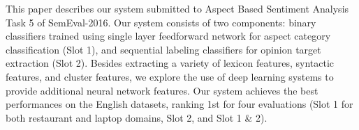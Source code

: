 This paper describes our system submitted to Aspect Based Sentiment Analysis Task 5 of SemEval-2016. Our system consists of two components: binary classifiers trained using single layer feedforward network for aspect category classification (Slot 1), and sequential labeling classifiers for opinion target extraction (Slot 2). Besides extracting a variety of lexicon features, syntactic features, and cluster features, we explore the use of deep learning systems to provide additional neural network features. Our system achieves the best performances on the English datasets, ranking 1st for four evaluations (Slot 1 for both restaurant and laptop domains, Slot 2, and Slot 1 \& 2).
